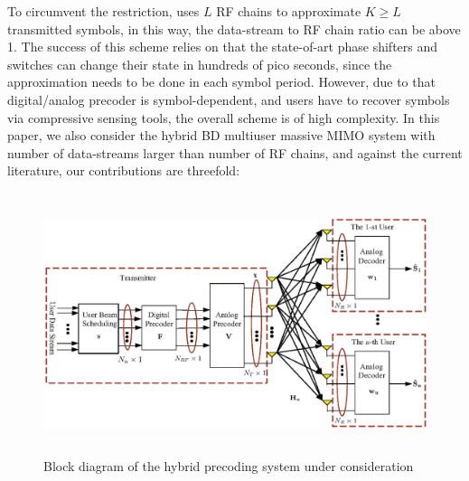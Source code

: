 \documentclass[conference]{IEEEtran}
\begin{document}
To circumvent the restriction, \cite{garcia2017mimo} uses $L$ RF chains to approximate $K\geq L$ transmitted symbols, in this way, the data-stream to RF chain ratio can be above 1. The success of this scheme relies on that the state-of-art phase shifters and switches can change their state in hundreds of pico seconds, since the approximation needs to be done in each symbol period. However, due to that digital/analog precoder is symbol-dependent, and users have to recover symbols via compressive sensing tools, the overall scheme is of high complexity. In this paper, we also consider the hybrid BD multiuser massive MIMO system with number of data-streams larger than number of RF chains, and against the current literature, our contributions are threefold:

\begin{figure}[t]
\centering
\begin{minipage}[t]{0.7\linewidth}
	\includegraphics[width=5.6in,height=3in]{PPTFigure/BlockDiagonal.eps}
	\caption{Block diagram of the hybrid precoding system under consideration}\label{fig:BlockDiagram}
	\parbox{6.5cm}{\small \hspace{1.5cm} }
\end{minipage}
\end{figure}
\end{document}
